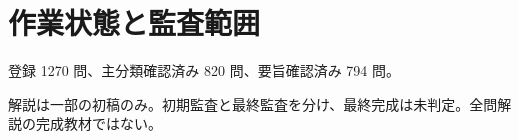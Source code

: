 \chapter{作業状態と監査範囲}
登録 1270 問、主分類確認済み 820 問、要旨確認済み 794 問。
\par 解説は一部の初稿のみ。初期監査と最終監査を分け、最終完成は未判定。全問解説の完成教材ではない。
